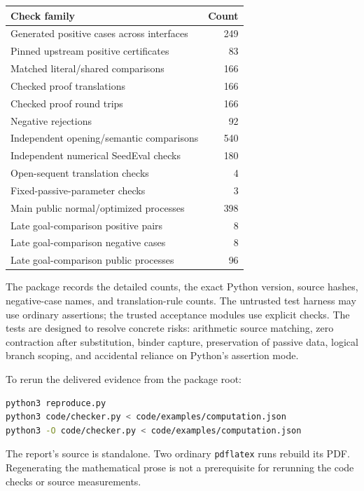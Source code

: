 \documentclass[11pt,letterpaper]{article}
\newcommand{\file}[1]{\nolinkurl{#1}}
\begin{document}
\begin{center}
\small
\begin{tabularx}{\linewidth}{@{}Xr@{}}
\toprule
Check family & Count\\
\midrule
Generated positive cases across interfaces & 249\\
Pinned upstream positive certificates & 83\\
Matched literal/shared comparisons & 166\\
Checked proof translations & 166\\
Checked proof round trips & 166\\
Negative rejections & 92\\
Independent opening/semantic comparisons & 540\\
Independent numerical SeedEval checks & 180\\
Open-sequent translation checks & 4\\
Fixed-passive-parameter checks & 3\\
Main public normal/optimized processes & 398\\
Late goal-comparison positive pairs & 8\\
Late goal-comparison negative cases & 8\\
Late goal-comparison public processes & 96\\
\bottomrule
\end{tabularx}
\end{center}

The package records the detailed counts, the exact Python version, source
hashes, negative-case names, and translation-rule counts. The untrusted
test harness may use ordinary assertions; the trusted acceptance modules
use explicit checks. The tests are designed to resolve concrete risks:
arithmetic source matching, zero contraction after substitution, binder
capture, preservation of passive data, logical branch scoping, and
accidental reliance on Python's assertion mode.

To rerun the delivered evidence from the package root:
\begin{lstlisting}[language=bash]
python3 reproduce.py
python3 code/checker.py < code/examples/computation.json
python3 -O code/checker.py < code/examples/computation.json
\end{lstlisting}
The report's source is standalone. Two ordinary \file{pdflatex} runs
rebuild its PDF. Regenerating the mathematical prose is not a prerequisite
for rerunning the code checks or source measurements.
\end{document}
